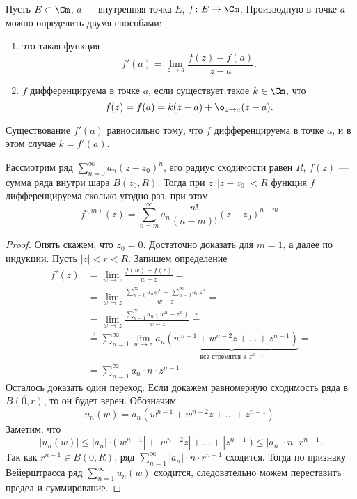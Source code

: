 \begin{defn}
    Пусть $ E \subset \Cm$, $ a$ --- внутренняя точка $ E$,  $ f\colon E \to  \Cm$. Производную в точке $ a $ можно определить двумя способами:
	\begin{enumerate}
		\item это такая функция 
			\[
				f'(a)  =  \lim_{z \to  a}  \frac{f(z)- f(a)}{z - a}
			.\] 
		\item $ f$ дифференцируема в точке $ a$, если существует такое $ k \in \Cm$, что 
			\[
				f(z) = f(a) = k(z-a) + \o_{z \to  a}(z - a) 
			.\] 
	\end{enumerate} 
	\begin{note}
		Существование  $ f'(a)$ равносильно тому, что $ f$ дифференцируема в точке $ a$, и в этом случае  $ k = f'(a)$.
	\end{note}
\end{defn}
\begin{thm} \label{th:diff}
	Рассмотрим ряд $ \sum_{n=0}^{\infty} a_{n} (z - z_0)^{n}$, его радиус сходимости равен  $ R$, $ f(z)$ --- сумма ряда внутри шара $ B(z_0, R)$. Тогда при $ z\colon \lvert z- z_0 \rvert <R$ функция $ f$ дифференцируема сколько угодно раз, при этом 
	\[
		f^{(m)} (z) = \sum_{n=m}^{\infty} a_{n} \frac{n!}{(n-m)!} (z - z_0)^{n-m} 
	.\] 
\end{thm}
\begin{proof}
    Опять скажем, что $ z_0 = 0$. Достаточно доказать для $ m=1$, а далее по индукции. Пусть $ \lvert z \rvert < r < R $. Запишем  определение
	\[
	\begin{aligned}
		f'(z) & = \lim_{w \to  z}  \frac{f(w) - f(z)}{w - z} =\\ &= \lim_{w \to  z} \frac{\sum_{n=0}^{\infty} a_{n} w^{n} - \sum_{n=0}^{\infty} a_{n}z^{n}}{w - z} = \\
			  & = \lim_{w \to z} \frac{\sum_{n=1}^{\infty} a_{n}(w^{n}-z^{n})}{w-z} \stackrel{?}{=}  \\
			  & \stackrel{?}{=} \sum_{n=1}^{\infty} \lim_{w \to z} a_{n} \underbrace{(w ^{n-1} + w^{n-2} z + \ldots + z^{n-1})}_{\text{все стремятся к } z^{n-1}} =\\ &= \sum_{n=1}^{\infty} a_{n} \cdot  n \cdot z^{n-1}
	\end{aligned}
	\]
	Осталось доказать один переход. Если докажем равномерную сходимость ряда в $ \overline{B(0, r)}$, то он будет верен.
	Обозначим 
	\[
		u_n(w) = a_{n}(w^{n-1} + w^{n-2} z + \ldots + z^{n-1})
	.\] 
	Заметим, что 
	\[
		\lvert u_n(w)  \rvert \le \lvert a_{n} \rvert \cdot \bigl(\left| w^{n-1} \right|  + \left| w^{n-2} z \right| + \ldots + \left| z^{n-1} \right| \bigr) \le \lvert a_{n} \rvert  \cdot n \cdot  r^{n-1}
	.\] 
	Так как $ r^{n-1} \in \overline{B(0, R)}$, ряд $ \sum_{n=1}^{\infty} \lvert a_{n}  \rvert \cdot n \cdot  r^{n-1}$ сходится.  Тогда по признаку Вейерштрасса ряд $ \sum_{n=1}^{\infty} u_n(w)$ сходится, следовательно можем переставить предел и суммирование. 
\end{proof}

